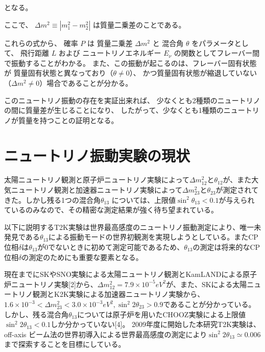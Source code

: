 となる。

ここで、
$\Delta m^{2} \equiv |m_{1}^{2} - m_{2}^{2}|$ は質量二乗差のことである。

これらの式から、
確率 $P$ は
質量二乗差 $\Delta m^{2}$ と
混合角 $\theta$ をパラメータとして、
飛行距離 $L$ および
ニュートリノエネルギー $E_{\nu}$ の関数としてフレーバー間で振動することがわかる。
また、この振動が起こるのは、フレーバー固有状態が
質量固有状態と異なっており（$\theta \neq 0$）、
かつ質量固有状態が縮退していない（$\Delta m^{2} \neq 0$）場合であることが分かる。

このニュートリノ振動の存在を実証出来れば、
少なくとも2種類のニュートリノの間に質量差が生じることになり、
したがって、少なくとも1種類のニュートリノが質量を持つことの証明となる。






\section{ニュートリノ振動実験の現状}

太陽ニュートリノ観測と原子炉ニュートリノ実験によって$\Delta m_{12}^{2}$と$\theta_{12}$が、また大気ニュートリノ観測と加速器ニュートリノ実験によって$\Delta m_{23}^{2}$と$\theta_{23}$が測定されてきた。しかし残る1つの混合角$\theta_{13}$	については、上限値$\sin^{2}\theta_{13}<0.1$が与えられているのみなので、その精密な測定結果が強く待ち望まれている。

以下に説明するT2K実験は世界最高感度のニュートリノ振動測定により、唯一未発見である$\theta_{13}$による振動モードの世界初観測を実現しようとしている。またCP位相$\delta$は$\theta_{13}$が0でないときに初めて測定可能であるため、$\theta_{13}$の測定は将来的なCP位相$\delta$の測定のためにも重要な要素となる。

現在までにSKやSNO実験による太陽ニュートリノ観測とKamLANDによる原子炉ニュートリノ実験[2]から、$\Delta m_{12}^{2}=7.9 \times 10^{-5} eV^{2}$が、また、SKによる太陽ニュートリノ観測とK2K実験による加速器ニュートリノ実験から、$1.6 \times 10^{-3} < \Delta m_{23}^{2} < 3.0 \times 10^{-3} eV^{2}, \sin^{2}2\theta_{23} > 0.9$であることが分かっている。しかし、残る混合角$\theta_{13}$については原子炉を用いたCHOOZ実験による上限値$\sin^{2}2\theta_{13} < 0.1$しか分かっていない[4]。 2009年度に開始した本研究T2K実験は、off-axis ビーム法の世界初導入による世界最高感度の測定により$\sin^{2}2\theta_{13} \simeq 0.006$まで探索することを目標にしている。
\fi

